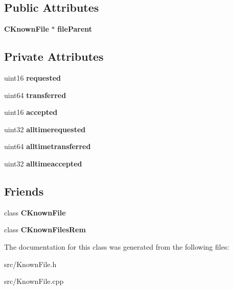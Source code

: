 \subsection*{Public Attributes}
\begin{DoxyCompactItemize}
\item 
{\bf CKnownFile} $\ast$ {\bfseries fileParent}\label{classCFileStatistic_ae4c8096b677c1af3cc93c5f939837610}

\end{DoxyCompactItemize}
\subsection*{Private Attributes}
\begin{DoxyCompactItemize}
\item 
uint16 {\bfseries requested}\label{classCFileStatistic_a799d8ff8b91eec557f8c699517a76e87}

\item 
uint64 {\bfseries transferred}\label{classCFileStatistic_ac82c215cc6b227f4e41e4e82c0997f1c}

\item 
uint16 {\bfseries accepted}\label{classCFileStatistic_ae11e2019a966d1639f1c94b18c104e28}

\item 
uint32 {\bfseries alltimerequested}\label{classCFileStatistic_ac9bbcd115e330410d0ad0fa8a418332f}

\item 
uint64 {\bfseries alltimetransferred}\label{classCFileStatistic_a50b74f405bcc3ebe9e7408b0dfcb3b76}

\item 
uint32 {\bfseries alltimeaccepted}\label{classCFileStatistic_a11e4f0c5446f476d2ca1a72fee521672}

\end{DoxyCompactItemize}
\subsection*{Friends}
\begin{DoxyCompactItemize}
\item 
class {\bf CKnownFile}\label{classCFileStatistic_a6dde6c7f3c9e194043690e790fd52338}

\item 
class {\bf CKnownFilesRem}\label{classCFileStatistic_aececa004c228e6d1c42c2b404385f7a2}

\end{DoxyCompactItemize}


The documentation for this class was generated from the following files:\begin{DoxyCompactItemize}
\item 
src/KnownFile.h\item 
src/KnownFile.cpp\end{DoxyCompactItemize}
